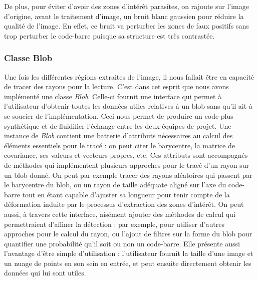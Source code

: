 \documentclass{rapport}
\begin{document}
De plus, pour éviter d'avoir des zones d'intérêt parasites, on rajoute sur l'image d'origine, avant le traitement d'image, un bruit blanc gaussien pour réduire la qualité de l'image. En effet, ce bruit va perturber les zones de faux positifs sans trop perturber le code-barre puisque sa structure est très contrastée.

\subsubsection*{Classe Blob}
Une fois les différentes régions extraites de l'image, il nous fallait être en capacité de tracer des rayons pour la lecture. C'est dans cet esprit que nous avons implémenté une classe \textit{Blob}. Celle-ci fournit une interface qui permet à l'utilisateur d'obtenir toutes les données utiles relatives à un blob sans qu'il ait à se soucier de l'implémentation. Ceci nous permet de produire un code plus synthétique et de fluidifier l'échange entre les deux équipes de projet.
\newline \newline Une instance de \textit{Blob} contient une batterie d'attributs nécessaires au calcul des éléments essentiels pour le tracé : on peut citer le barycentre, la matrice de covariance, ses valeurs et vecteurs propres, etc. Ces attributs sont accompagnés de méthodes qui implémentent plusieurs approches pour le tracé d'un rayon sur un blob donné. On peut par exemple tracer des rayons aléatoires qui passent par le barycentre du blob, ou un rayon de taille adéquate aligné sur l'axe du code-barre tout en étant capable d'ajuster sa longueur pour tenir compte de la déformation induite par le processus d'extraction des zones d'intérêt.
\newline \newline On peut aussi, à travers cette interface, aisément ajouter des méthodes de calcul qui permettraient d'affiner la détection : par exemple, pour utiliser d'autres approches pour le calcul du rayon, ou l'ajout de filtres sur la forme du blob pour quantifier une probabilité qu'il soit ou non un code-barre. Elle présente aussi l'avantage d'être simple d'utilisation : l'utilisateur fournit la taille d'une image et un nuage de points en son sein en entrée, et peut ensuite directement obtenir les données qui lui sont utiles.
\end{document}
